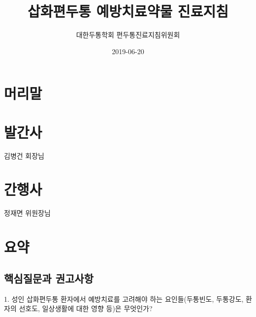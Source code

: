 \documentclass[]{book}
\title{삽화편두통 예방치료약물 진료지침}
\author{대한두통학회 편두통진료지침위원회}
\date{2019-06-20}
\begin{document}
\maketitle

{
\setcounter{tocdepth}{1}
\tableofcontents
}
\frontmatter

\hypertarget{section}{%
\chapter*{머리말}\label{section}}

\hypertarget{section-1}{%
\chapter*{발간사}\label{section-1}}

김병건 회장님

\hypertarget{section-2}{%
\chapter*{간행사}\label{section-2}}

정재면 위원장님

\mainmatter

\hypertarget{section-3}{%
\chapter{요약}\label{section-3}}

\hypertarget{section-4}{%
\section{핵심질문과 권고사항}\label{section-4}}

1. 성인 삽화편두통 환자에서 예방치료를 고려해야 하는 요인들(두통빈도, 두통강도, 환자의 선호도, 일상생활에 대한 영향 등)은 무엇인가?
\end{document}

